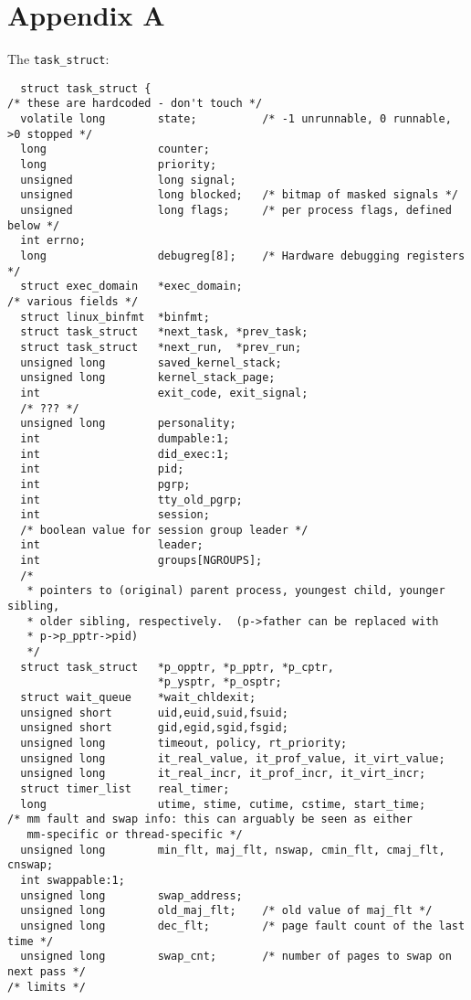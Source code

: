 \documentclass[10pt,letterpaper,onecolumn,draftclsnofoot]{IEEEtran}
\begin{document}
\section{Appendix A}
The \texttt{task\_struct}:\cite{linustorvalds2016}
\begin{lstlisting}
  struct task_struct {
/* these are hardcoded - don't touch */
  volatile long        state;          /* -1 unrunnable, 0 runnable, >0 stopped */
  long                 counter;
  long                 priority;
  unsigned             long signal;
  unsigned             long blocked;   /* bitmap of masked signals */
  unsigned             long flags;     /* per process flags, defined below */
  int errno;
  long                 debugreg[8];    /* Hardware debugging registers */
  struct exec_domain   *exec_domain;
/* various fields */
  struct linux_binfmt  *binfmt;
  struct task_struct   *next_task, *prev_task;
  struct task_struct   *next_run,  *prev_run;
  unsigned long        saved_kernel_stack;
  unsigned long        kernel_stack_page;
  int                  exit_code, exit_signal;
  /* ??? */
  unsigned long        personality;
  int                  dumpable:1;
  int                  did_exec:1;
  int                  pid;
  int                  pgrp;
  int                  tty_old_pgrp;
  int                  session;
  /* boolean value for session group leader */
  int                  leader;
  int                  groups[NGROUPS];
  /*
   * pointers to (original) parent process, youngest child, younger sibling,
   * older sibling, respectively.  (p->father can be replaced with
   * p->p_pptr->pid)
   */
  struct task_struct   *p_opptr, *p_pptr, *p_cptr,
                       *p_ysptr, *p_osptr;
  struct wait_queue    *wait_chldexit;
  unsigned short       uid,euid,suid,fsuid;
  unsigned short       gid,egid,sgid,fsgid;
  unsigned long        timeout, policy, rt_priority;
  unsigned long        it_real_value, it_prof_value, it_virt_value;
  unsigned long        it_real_incr, it_prof_incr, it_virt_incr;
  struct timer_list    real_timer;
  long                 utime, stime, cutime, cstime, start_time;
/* mm fault and swap info: this can arguably be seen as either
   mm-specific or thread-specific */
  unsigned long        min_flt, maj_flt, nswap, cmin_flt, cmaj_flt, cnswap;
  int swappable:1;
  unsigned long        swap_address;
  unsigned long        old_maj_flt;    /* old value of maj_flt */
  unsigned long        dec_flt;        /* page fault count of the last time */
  unsigned long        swap_cnt;       /* number of pages to swap on next pass */
/* limits */

\end{lstlisting}
\end{document}
